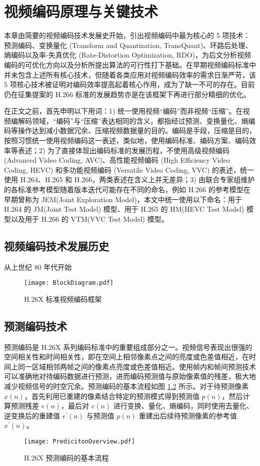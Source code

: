 \chapter{视频编码原理与关键技术}
\label{cha:c2}
本章由简要的视频编码技术发展史开始，引出视频编码中最为核心的 5 项技术：预测编码、变换量化 (Transform and Quantization, TransQuant)、环路后处理、熵编码以及率-失真优化 (Rate-Distortion Optimization, RDO)，为后文分析视频编码的可优化方向以及分析所提出算法的可行性打下基础。在早期视频编码标准中并未包含上述所有核心技术，但随着各类应用对视频编码效率的需求日渐严苛，该 5 项核心技术被证明对编码效率提高起着核心作用，成为了缺一不可的存在。目前仍在征集提案的 H.266 标准的发展趋势亦是在该框架下再进行部分精细的优化。

在正文之前，首先申明以下用词：1) 统一使用视频“编码”而非视频“压缩”。在视频编解码领域，“编码”与“压缩”表达相同的含义，都指经过预测、变换量化、熵编码等操作达到减小数据冗余、压缩视频数据量的目的。编码是手段，压缩是目的，按照习惯统一使用视频编码这一表述，类似地，使用编码标准、编码方案、编码效率等表述；2) 为了直接体现出编码标准的发展历程，不使用高级视频编码 (Advanced Video Coding, AVC)、高性能视频编码 (High Efficiency Video Coding, HEVC) 和多功能视频编码 (Versatile Video Coding, VVC) 的表述，统一使用 H.264、H.265 和 H.266，两类表述在含义上并无差异；3) 由联合专家组维护的各标准参考模型随着版本迭代可能存在不同的命名，例如 H.266 的参考模型在早期曾称为 JEM(Joint Exploration Model)，本文中统一使用以下命名：用于 H.264 的 JM(Joint Test Model) 模型、用于 H.265 的 HM(HEVC Test Model) 模型以及用于 H.266 的 VTM(VVC Test Model) 模型。

\section{视频编码技术发展历史}
从上世纪 80 年代开始
\begin{figure}[htb]
    \centering
    \texttt{[image: BlockDiagram.pdf]}
    \caption{H.26X 标准视频编码框架}
    \label{fig:BlockDiagram}
\end{figure}

\section{预测编码技术}
预测编码是 H.26X 系列编码标准中的重要组成部分之一。视频信号表现出很强的空间相关性和时间相关性，即在空间上相邻像素点之间的亮度或色差值相近，在时间上同一区域相邻两帧之间的像素点亮度或色差值相近。使用帧内和帧间预测技术可以准确地对待编码数据进行预测，进而编码预测值与原始像素值的残差，极大地减少视频信号的时空冗余。预测编码的基本流程如图 \ref{fig:PredicitonOverview} 所示。对于待预测像素 $x(n)$，首先利用已重建的像素结合特定的预测模式得到预测值 $p(n)$，然后计算预测残差 $e(n)$，最后对 $e(n)$ 进行变换、量化、熵编码，同时使用去量化、逆变换后的重建值 $e^{'}(n)$ 与预测值 $p(n)$ 重建出后续待预测像素的参考值 $x^{'}(n)$。
\begin{figure}[htb]
    \centering
    \texttt{[image: PredicitonOverview.pdf]}
    \caption{H.26X 预测编码的基本流程}
    \label{fig:PredicitonOverview}
\end{figure}

